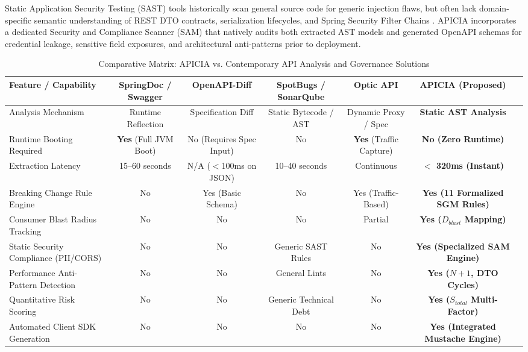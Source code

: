 \documentclass[conference]{IEEEtran}
\begin{document}
Static Application Security Testing (SAST) tools historically scan general source code for generic injection flaws, but often lack domain-specific semantic understanding of REST DTO contracts, serialization lifecycles, and Spring Security Filter Chains \cite{sundberg2023validating}. APICIA incorporates a dedicated Security and Compliance Scanner (SAM) that natively audits both extracted AST models and generated OpenAPI schemas for credential leakage, sensitive field exposures, and architectural anti-patterns prior to deployment.

\begin{table}[t]
\caption{Comparative Matrix: APICIA vs. Contemporary API Analysis and Governance Solutions}
\label{tab:comparative_matrix}
\centering
\scriptsize
\begin{tabular}{@{}lcccccc@{}}
\toprule
\textbf{Feature / Capability} & \textbf{SpringDoc / Swagger} & \textbf{OpenAPI-Diff} & \textbf{SpotBugs / SonarQube} & \textbf{Optic API} & \textbf{APICIA (Proposed)} \\
\midrule
Analysis Mechanism & Runtime Reflection & Specification Diff & Static Bytecode / AST & Dynamic Proxy / Spec & \textbf{Static AST Analysis} \\
Runtime Booting Required & \textbf{Yes} (Full JVM Boot) & No (Requires Spec Input) & No & \textbf{Yes} (Traffic Capture) & \textbf{No (Zero Runtime)} \\
Extraction Latency & 15--60 seconds & N/A ($<$100ms on JSON) & 10--40 seconds & Continuous & \textbf{$<$ 320ms (Instant)} \\
Breaking Change Rule Engine & No & Yes (Basic Schema) & No & Yes (Traffic-Based) & \textbf{Yes (11 Formalized SGM Rules)} \\
Consumer Blast Radius Tracking & No & No & No & Partial & \textbf{Yes ($D_{blast}$ Mapping)} \\
Static Security Compliance (PII/CORS) & No & No & Generic SAST Rules & No & \textbf{Yes (Specialized SAM Engine)} \\
Performance Anti-Pattern Detection & No & No & General Lints & No & \textbf{Yes ($N+1$, DTO Cycles)} \\
Quantitative Risk Scoring & No & No & Generic Technical Debt & No & \textbf{Yes ($S_{total}$ Multi-Factor)} \\
Automated Client SDK Generation & No & No & No & No & \textbf{Yes (Integrated Mustache Engine)} \\
\bottomrule
\end{tabular}
\end{table}
\end{document}
